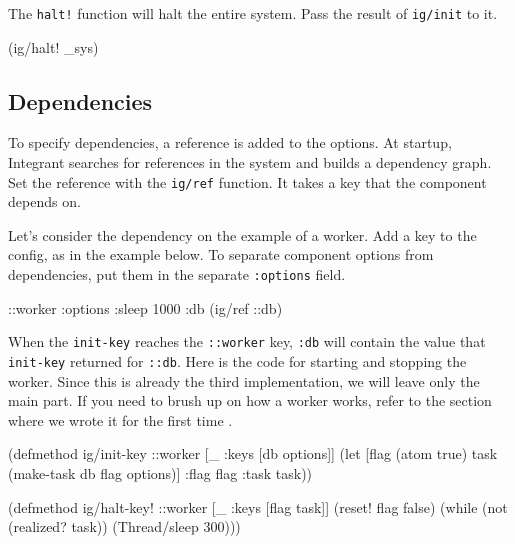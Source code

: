 \fi

\noindent
The \verb|halt!| function will halt the entire system. Pass the result of \verb|ig/init| to it.

\begin{english}
  \begin{clojure}
(ig/halt! _sys)
  \end{clojure}
\end{english}

\subsection{Dependencies}


To specify dependencies, a reference is added to the options. At startup, Integrant searches for references in the system and builds a dependency graph. Set the reference with the \verb|ig/ref| function. It takes a key that the component depends on.

Let's consider the dependency on the example of a worker. Add a key to the config, as in the example below. To separate component options from dependencies, put them in the separate \verb|:options| field.

\begin{english}
  \begin{clojure}
{::worker {:options {:sleep 1000}
           :db (ig/ref ::db)}}
  \end{clojure}
\end{english}

When the \verb|init-key| reaches the \verb|::worker| key, \verb|:db| will contain the value that \verb|init-key| returned for \verb|::db|. Here is the code for starting and stopping the worker. Since this is already the third implementation, we will leave only the main part. If you need to brush up on how a worker works, refer to the section where we wrote it for the first time .

\begin{english}
  \begin{clojure}
(defmethod ig/init-key ::worker
  [_ {:keys [db options]}]
  (let [flag (atom true)
        task (make-task db flag options)]
    {:flag flag :task task}))

(defmethod ig/halt-key! ::worker
  [_ {:keys [flag task]}]
  (reset! flag false)
  (while (not (realized? task))
    (Thread/sleep 300)))
  \end{clojure}
\end{english}


